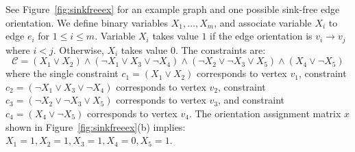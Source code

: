 {See Figure~\ref{fig:sinkfreeex} for an example graph and one possible sink-free edge orientation. We define binary variables $X_1,\ldots, X_m$, and associate variable $X_i$ to edge $e_i$ for $1\le i\le m$. Variable $X_i$ takes value $1$ if the edge orientation is $v_i\to v_j$ where $i<j$. Otherwise, $X_i$ takes value $0$. The constraints are:}
\begin{equation*}
    \mathcal{C}=(X_1\vee X_2)\wedge(\neg X_1\vee X_3\vee\neg X_4)\wedge(\neg X_2\vee\neg X_3\vee X_5)\wedge(X_4\vee \neg X_5)
\end{equation*}
{where the single constraint  $c_1=(X_1\vee X_2)$ corresponds to vertex $v_1$, constraint $c_2=(\neg X_1\vee X_3\vee\neg X_4)$ corresponds to vertex  $v_2$, constraint $c_3=(\neg X_2\vee\neg X_3\vee X_5)$  corresponds to vertex  $v_3$, and constraint $c_4=(X_4\vee \neg X_5)$ corresponds to vertex  $v_4$. The orientation assignment matrix $x$ shown in Figure~\ref{fig:sinkfreeex}(b) implies: $X_1=1,X_2=1,X_3=1,X_4=0,X_5=1$.}

